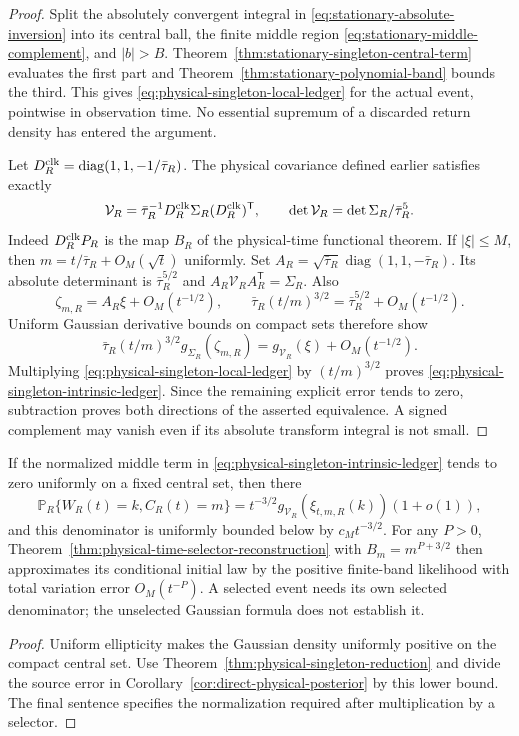 \begin{proof}
Split the absolutely convergent integral in
\eqref{eq:stationary-absolute-inversion} into its central ball, the
finite middle region \eqref{eq:stationary-middle-complement}, and
$|b|>B$. Theorem~\ref{thm:stationary-singleton-central-term} evaluates
the first part and Theorem~\ref{thm:stationary-polynomial-band} bounds
the third. This gives \eqref{eq:physical-singleton-local-ledger} for
the actual event, pointwise in observation time. No essential supremum
of a discarded return density has entered the argument.

Let $D_R^{\rm clk}=\operatorname{diag}(1,1,-1/\bar\tau_R)$. The
physical covariance defined earlier satisfies exactly
\begin{equation}\label{eq:physical-covariance-jacobian}
 \mathcal V_R=\bar\tau_R^{-1}
              D_R^{\rm clk}\Sigma_R(D_R^{\rm clk})^{\mathsf T},\qquad
 \det\mathcal V_R=\det\Sigma_R/\bar\tau_R^5.
\end{equation}
Indeed $D_R^{\rm clk}P_R$ is the map $B_R$ of the physical-time
functional theorem. If $|\xi|\le M$, then
$m=t/\bar\tau_R+O_M(\sqrt t)$ uniformly. Set
$A_R=\sqrt{\bar\tau_R}\operatorname{diag}(1,1,-\bar\tau_R)$.
Its absolute determinant is $\bar\tau_R^{5/2}$ and
$A_R\mathcal V_RA_R^{\mathsf T}=\Sigma_R$. Also
\[
 \zeta_{m,R}=A_R\xi+O_M(t^{-1/2}),\qquad
 \bar\tau_R(t/m)^{3/2}=\bar\tau_R^{5/2}+O_M(t^{-1/2}).
\]
Uniform Gaussian derivative bounds on compact sets therefore show
\[
 \bar\tau_R(t/m)^{3/2}g_{\Sigma_R}(\zeta_{m,R})
                  =g_{\mathcal V_R}(\xi)+O_M(t^{-1/2}).
\]
Multiplying \eqref{eq:physical-singleton-local-ledger} by $(t/m)^{3/2}$
proves \eqref{eq:physical-singleton-intrinsic-ledger}. Since the
remaining explicit error tends to zero, subtraction proves both
directions of the asserted equivalence. A signed complement may
vanish even if its absolute transform integral is not small.
\end{proof}

\begin{corollary}
\label{cor:stationary-singleton-denominator-criterion}
If the normalized middle term in
\eqref{eq:physical-singleton-intrinsic-ledger} tends to zero uniformly
on a fixed central set, then there
\[
 \mathbb P_R\{W_R(t)=k,C_R(t)=m\}
           =t^{-3/2}g_{\mathcal V_R}(\xi_{t,m,R}(k))(1+o(1)),
\]
and this denominator is uniformly bounded below by $c_Mt^{-3/2}$.
For any $P>0$, Theorem~\ref{thm:physical-time-selector-reconstruction}
with $B_m=m^{P+3/2}$ then approximates its conditional initial law by
the positive finite-band likelihood with total variation error
$O_M(t^{-P})$. A selected event needs its own selected denominator;
the unselected Gaussian formula does not establish it.
\end{corollary}
\begin{proof}
Uniform ellipticity makes the Gaussian density uniformly positive on
the compact central set. Use
Theorem~\ref{thm:physical-singleton-reduction} and divide the source
error in Corollary~\ref{cor:direct-physical-posterior} by this lower
bound. The final sentence specifies the normalization required after
multiplication by a selector.
\end{proof}

